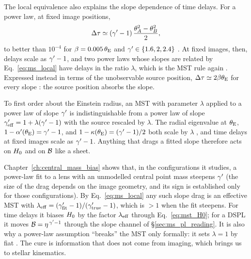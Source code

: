 The local equivalence also explains the slope dependence of time delays.  For
a power law, at fixed image positions,
\begin{equation}
    \Delta\tau\simeq(\gamma'-1)\,\frac{\theta_A^2-\theta_B^2}{2},
    \label{eq:ms_td_slope}
\end{equation}
to better than $10^{-4}$ for $\beta=0.005\,\theta_{\mathrm{E}}$ and $\gamma'\in\{1.6,2,2.4\}$
.  At fixed images, then, delays scale as $\gamma'-1$, and two power laws
whose slopes are related by Eq.~\eqref{eq:ms_local} have delays in the ratio
$\lambda$, which is the MST rule again .  Expressed instead in terms of
the unobservable source position, $\Delta\tau\simeq2\beta\theta_{\mathrm{E}}$ for every
slope : the source position absorbs the slope.

\begin{keybox}
To first order about the Einstein radius, an MST with parameter $\lambda$
applied to a power law of slope $\gamma'$ is indistinguishable from a power law of
slope $\gamma'_{\rm eff}=1+\lambda(\gamma'-1)$ with the source rescaled by $\lambda$.
The radial eigenvalue at $\theta_{\mathrm{E}}$, $1-\alpha'(\theta_{\mathrm{E}})=\gamma'-1$, and
$1-\kappa(\theta_{\mathrm{E}})=(\gamma'-1)/2$ both scale by $\lambda$ , and time
delays at fixed images scale as $\gamma'-1$.  Anything that drags a fitted slope
therefore acts on $H_0$ and on $\mathcal{B}$ like a sheet.
\end{keybox}

\begin{bridge}
Chapter~\ref{ch:central_mass_bias} shows that, in the configurations it
studies, a power-law fit to a lens with an unmodelled central point mass
steepens $\gamma'$ (the size of the drag depends on the image geometry, and
its sign is established only for those configurations).  By Eq.~\eqref{eq:ms_local} any such slope drag is an effective MST
with $\lambda_{\rm eff}=(\gamma'_{\rm fit}-1)/(\gamma'_{\rm true}-1)$, which is $>1$
when the fit steepens.  For time delays it
biases $H_0$ by the factor $\lambda_{\rm eff}$ through Eq.~\eqref{eq:mst_H0}; for a
DSPL it moves $\mathcal{B}=\eta^{\,\gamma'-1}$ through the slope channel of
\S\ref{sec:ms_pl_reading}.  It is also why a power-law assumption ``breaks''
the MST only formally: it sets $\lambda=1$ by fiat
\citep{schneider_sluse_2013}.  The cure is information that does not come from
imaging, which brings us to stellar kinematics.
\end{bridge}


